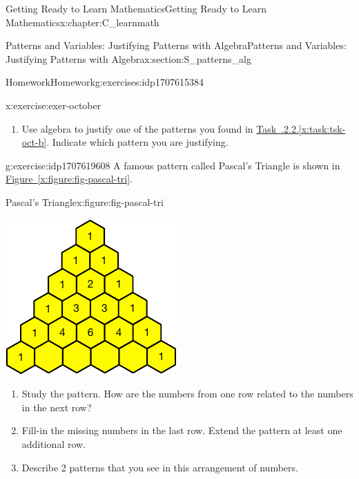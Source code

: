 \documentclass[oneside,10pt,]{book}
\newcommand{\xreffont}{\relax}
\numberwithin{equation}{chapter}
\begin{document}
\begin{chapterptx}{Getting Ready to Learn Mathematics}{}{Getting Ready to Learn Mathematics}{}{}{x:chapter:C_learnmath}
\begin{sectionptx}{Patterns and Variables: Justifying Patterns with Algebra}{}{Patterns and Variables: Justifying Patterns with Algebra}{}{}{x:section:S_patterns_alg}
\begin{exercises-subsection}{Homework}{}{Homework}{}{}{g:exercises:idp1707615384}
\begin{divisionexercise}{2}{}{}{x:exercise:exer-october}
\begin{enumerate}[font=\bfseries,label=(\alph*),ref=\alph*]
\item{}Use algebra to justify one of the patterns you found in \hyperref[x:task:tsk-oct-b]{Task~{\xreffont 1.8.2.2}.{\xreffont\ref{x:task:tsk-oct-b}}}. Indicate which pattern you are justifying.%
\end{enumerate}
\end{divisionexercise}%
\begin{divisionexercise}{3}{}{}{g:exercise:idp1707619608}%
A famous pattern called Pascal's Triangle is shown in \hyperref[x:figure:fig-pascal-tri]{Figure~{\xreffont\ref{x:figure:fig-pascal-tri}}}.%
\begin{figureptx}{Pascal's Triangle}{x:figure:fig-pascal-tri}{}%
\begin{image}{0.25}{0.5}{0.25}%
\includegraphics[width=\linewidth]{external/pascal-tri.pdf}
\end{image}%
\tcblower
\end{figureptx}%
\begin{enumerate}[font=\bfseries,label=(\alph*),ref=\alph*]
\item{}Study the pattern. How are the numbers from one row related to the numbers in the next row?%
\item{}Fill-in the missing numbers in the last row. Extend the pattern at least one additional row.%
\item{}Describe 2 patterns that you see in this arrangement of numbers.%
\end{enumerate}

\end{divisionexercise}
\end{exercises-subsection}
\end{sectionptx}
\end{chapterptx}
\end{document}
